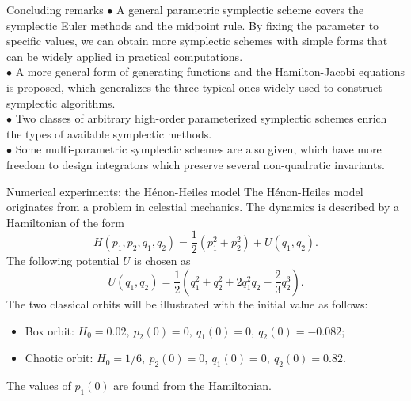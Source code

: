 \documentclass[10pt]{beamer}
\begin{document}
\begin{frame}{Concluding remarks}
\quad\textcolor[rgb]{0,0,1}{$\bullet$} A general parametric symplectic scheme covers the symplectic Euler methods and the midpoint rule. By fixing the parameter to specific values, we can obtain more symplectic schemes with simple forms that can be widely applied in practical computations.\\  
\vspace{4mm}
\quad\textcolor[rgb]{0,0,1}{$\bullet$} A more general form of generating functions and the Hamilton-Jacobi equations is proposed, which generalizes the three typical ones widely used to construct symplectic algorithms.\\
\vspace{4mm}
\quad\textcolor[rgb]{0,0,1}{$\bullet$} Two classes of arbitrary high-order parameterized symplectic schemes enrich the types of available symplectic methods.\\
\vspace{4mm}
\quad\textcolor[rgb]{0,0,1}{$\bullet$} Some multi-parametric symplectic schemes are also given, which have more freedom to design integrators which preserve several non-quadratic invariants.\\
\end{frame}

\begin{frame}{Numerical experiments: the H\'{e}non-Heiles model}
The H\'{e}non-Heiles model originates from a problem in celestial mechanics. The dynamics is described by a Hamiltonian of the form
\begin{equation*}
H(p_1,p_2,q_1,q_2)=\frac{1}{2}(p_1^2+p_2^2)+U(q_1,q_2).
\end{equation*}
The following potential $U$ is chosen as
\begin{equation*}
U(q_1,q_2)=\frac{1}{2}(q_1^2+q_2^2+2 q_1^2 q_2-\frac{2}{3}q_2^3).
\end{equation*}
The two classical orbits will be illustrated with the initial value as follows:\\ 
\begin{itemize}
\item Box orbit: $H_0=0.02,\ p_2(0)=0,\ q_1(0)=0,\ q_2(0)=-0.082$;
\item Chaotic orbit: $H_0=1/6,\ p_2(0)=0,\ q_1(0)=0,\ q_2(0)=0.82$.
\end{itemize}
The values of $p_1(0)$ are found from the Hamiltonian.
\end{frame}
\end{document}
